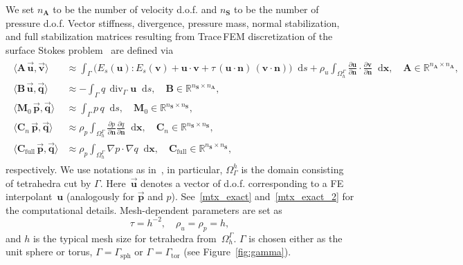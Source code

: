 \documentclass[12pt]{article}
\newcommand{\vect}[1]{\boldsymbol{\mathbf{#1}}}
\newcommand*\diff{\mathop{}\!\mathrm{d}}
\DeclareMathOperator{\Div}{div}
\newcommand{\sphere}{{\Gamma_{\text{sph}}}}
\newcommand{\tor}{{\Gamma_{\text{tor}}}}
\begin{document}
We set $n_{\vect A}$ to be the number of velocity d.o.f. and $n_{\vect S}$ to be the number of pressure d.o.f. Vector stiffness, divergence, pressure mass, normal stabilization, and full stabilization matrices resulting from Trace\,FEM discretization of the surface Stokes problem~\cite{surfstokes} are defined via
\begin{align}\begin{split}\label{mtx}
	\langle \vect A\,\vec{\vect u}, \vec{\vect v} \rangle &\approx 
		\int_{\Gamma} \big( E_s(\vect u) : E_s(\vect v) + \vect u\cdot\vect v + \tau\,(\vect u\cdot\vect n)\,(\vect v\cdot\vect n) \big) \diff{s} + 
		\rho_u \int_{\Omega_h^{\Gamma}} \frac{\partial \vect u}{\partial\vect n}\cdot\frac{\partial \vect v}{\partial\vect n} \diff{\vect x}, \quad \vect A \in \mathbb R^{n_{\vect A} \times n_{\vect A}},\\
	\langle \vect B\,\vec{\vect u}, \vec{\vect q} \rangle &\approx 
		-\int_{\Gamma} q\,\Div_{\Gamma} \vect u \diff{s}, \quad \vect B \in \mathbb R^{n_{\vect S} \times n_{\vect A}},\\
	\langle \vect M_0\,\vec{\vect p}, \vec{\vect q} \rangle &\approx
		\int_{\Gamma} p\,q \diff{s}, \quad \vect M_0 \in \mathbb R^{n_{\vect S} \times n_{\vect S}},\\
	\langle \vect C_n\,\vec{\vect p}, \vec{\vect q} \rangle &\approx
		\rho_p \int_{\Omega^{\Gamma}_h} \frac{\partial p}{\partial\vect n} \frac{\partial q}{\partial\vect n} \diff{\vect x}, \quad \vect C_n \in \mathbb R^{n_{\vect S} \times n_{\vect S}},\\
	\langle \vect C_{\text{full}}\,\vec{\vect p}, \vec{\vect q} \rangle &\approx
		\rho_p \int_{\Omega^{\Gamma}_h} \nabla p \cdot \nabla q \diff{\vect x}, \quad \vect C_{\text{full}} \in \mathbb R^{n_{\vect S} \times n_{\vect S}},		 
\end{split}\end{align}
respectively. We use notations as in~\cite{surfstokes}, in particular, $\Omega_\Gamma^h$ is the domain consisting of tetrahedra cut by $\Gamma$. Here~$\vec{\vect u}$ denotes a vector of d.o.f. corresponding to a FE interpolant~$\vect u$ (analogously for $\vec{\vect p}$ and $p$). See~\eqref{mtx_exact} and~\eqref{mtx_exact_2} for the computational details. Mesh-dependent parameters are set as
\begin{equation}
	\tau = h^{-2}, \quad \rho_u = \rho_p = h,
\end{equation}
and $h$ is the typical mesh size for tetrahedra from~$\Omega^{\Gamma}_h$. $\Gamma$ is chosen either as the unit sphere or torus, $\Gamma = \sphere$ or $\Gamma = \tor$ (see Figure~\ref{fig:gamma}).
\end{document}
